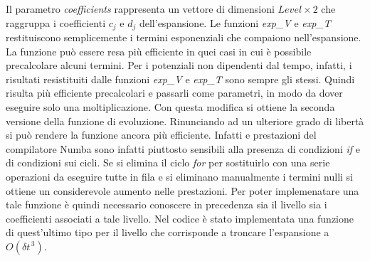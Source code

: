 Il parametro \textsl{coefficients} rappresenta un vettore di dimensioni $Level \times 2$ che raggruppa i coefficienti $c_j$ e $d_j$ dell'espansione. 
Le funzioni \textsl{exp\_V} e \textsl{exp\_T} restituiscono semplicemente i termini esponenziali che compaiono nell'espansione. La funzione può essere resa più efficiente in quei casi in cui è possibile precalcolare alcuni termini. Per i potenziali non dipendenti dal tempo, infatti, i risultati resistituiti dalle funzioni \textsl{exp\_V} e \textsl{exp\_T} sono sempre gli stessi. Quindi risulta più efficiente precalcolari e passarli come parametri, in modo da dover eseguire solo una moltiplicazione. Con questa modifica si ottiene la seconda versione della funzione di evoluzione.
Rinunciando ad un ulteriore grado di libertà si può rendere la funzione ancora più efficiente. Infatti e prestazioni del compilatore Numba sono infatti piuttosto sensibili alla presenza di condizioni \textsl{if} e di condizioni sui cicli. Se si elimina il ciclo \textsl{for} per sostituirlo con una serie operazioni da eseguire tutte in fila e si eliminano manualmente i termini nulli si ottiene un considerevole aumento nelle prestazioni. Per poter implemenatare una tale funzione è quindi necessario conoscere in precedenza sia il livello sia i coefficienti associati a tale livello. Nel codice è stato implementata una funzione di quest'ultimo tipo per il livello che corrisponde a troncare l'espansione a $O(\delta t^{\, 3})$.




